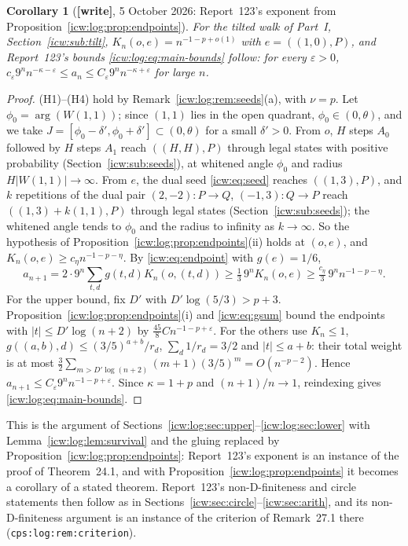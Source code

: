 \documentclass[11pt,letterpaper]{article}
\newtheorem{corollary}[theorem]{Corollary}
\theoremstyle{remark}\newtheorem{remark}[theorem]{Remark}
\newcommand{\eps}{\varepsilon}
\newcommand{\1}{\mathbf1}
\newcommand{\wtag}{\textup{\textbf{[write]}}}
\begin{document}
\begin{corollary}[\wtag, 5 October 2026: Report~123's exponent from Proposition~\ref{icw:log:prop:endpoints}]\label{icw:log:cor:exponent}
For the tilted walk of Part~I, Section~\ref{icw:sub:tilt}, $K_n(o,e)=n^{-1-p+o(1)}$ with $e=((1,0),P)$, and Report~123's bounds \eqref{icw:log:eq:main-bounds} follow: for every $\eps>0$, $c_\eps9^nn^{-\kappa-\eps}\le a_n\le C_\eps9^nn^{-\kappa+\eps}$ for large $n$.
\end{corollary}
\begin{proof}
(H1)--(H4) hold by Remark~\ref{icw:log:rem:seeds}(a), with $\nu=p$. Let $\phi_0=\arg(W(1,1))$; since $(1,1)$ lies in the open quadrant, $\phi_0\in(0,\theta)$, and we take $J=[\phi_0-\delta',\phi_0+\delta']\subset(0,\theta)$ for a small $\delta'>0$. From $o$, $H$ steps $A_0$ followed by $H$ steps $A_1$ reach $((H,H),P)$ through legal states with positive probability (Section~\ref{icw:sub:seeds}), at whitened angle $\phi_0$ and radius $H|W(1,1)|\to\infty$. From $e$, the dual seed \eqref{icw:eq:seed} reaches $((1,3),P)$, and $k$ repetitions of the dual pair $(2,-2):P\to Q$, $(-1,3):Q\to P$ reach $((1,3)+k(1,1),P)$ through legal states (Section~\ref{icw:sub:seeds}); the whitened angle tends to $\phi_0$ and the radius to infinity as $k\to\infty$. So the hypothesis of Proposition~\ref{icw:log:prop:endpoints}(ii) holds at $(o,e)$, and $K_n(o,e)\ge c_\eta n^{-1-p-\eta}$. By \eqref{icw:eq:endpoint} with $g(e)=1/6$,
\[
 a_{n+1}=2\cdot9^n\sum_{t,d}g(t,d)K_n(o,(t,d))\ge\tfrac13\,9^nK_n(o,e)\ge\tfrac{c_\eta}3\,9^nn^{-1-p-\eta}.
\]
For the upper bound, fix $D'$ with $D'\log(5/3)>p+3$. Proposition~\ref{icw:log:prop:endpoints}(i) and \eqref{icw:eq:gsum} bound the endpoints with $|t|\le D'\log(n+2)$ by $\frac{45}8Cn^{-1-p+\eps}$. For the others use $K_n\le1$, $g((a,b),d)\le(3/5)^{a+b}/r_d$, $\sum_d1/r_d=3/2$ and $|t|\le a+b$: their total weight is at most $\frac32\sum_{m>D'\log(n+2)}(m+1)(3/5)^m=O(n^{-p-2})$. Hence $a_{n+1}\le C_\eps9^nn^{-1-p+\eps}$. Since $\kappa=1+p$ and $(n+1)/n\to1$, reindexing gives \eqref{icw:log:eq:main-bounds}.
\end{proof}
This is the argument of Sections~\ref{icw:log:sec:upper}--\ref{icw:log:sec:lower} with Lemma~\ref{icw:log:lem:survival} and the gluing replaced by Proposition~\ref{icw:log:prop:endpoints}: Report~123's exponent is an instance of the proof of Theorem~24.1, and with Proposition~\ref{icw:log:prop:endpoints} it becomes a corollary of a stated theorem. Report~123's non-D-finiteness and circle statements then follow as in Sections~\ref{icw:sec:circle}--\ref{icw:sec:arith}, and its non-D-finiteness argument is an instance of the criterion of Remark~27.1 there (\texttt{cps:log:rem:criterion}).
\end{document}
